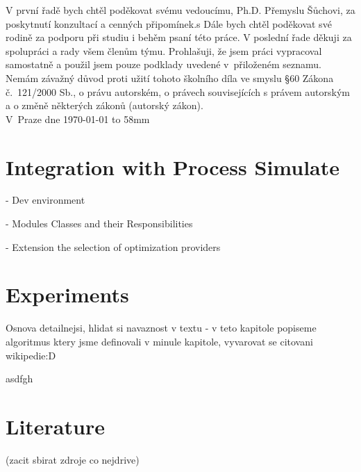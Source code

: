 \documentclass[11pt,twoside,a4paper]{book}
\author{Jan Dryk}
\begin{document}
%
\cleardoublepage

\maketitle
\cleardoublepage

{%
	V první řadě bych chtěl poděkovat svému vedoucímu, Ph.D. Přemyslu Šůchovi, za poskytnutí konzultací a cenných připomínek.s
	Dále bych chtěl poděkovat své rodině za podporu při studiu i behěm psaní této práce.
	V poslední řade děkuji za spolupráci a rady všem členům týmu.
}
{%
	Prohlašuji, že jsem práci vypracoval samostatně a použil jsem pouze podklady uvedené v~přiloženém seznamu.\\
	Nemám závažný důvod proti užití tohoto školního díla ve smyslu \S 60 Zákona č.~121/2000 Sb., o právu autorském, o právech souvisejících s právem autorským a o změně některých zákonů (autorský zákon).
\\[15mm]
	V~Praze dne \today \vspace{10mm} \hfill \hbox to 58mm{\tiny\dotfill}
}

\cleardoublepage


{
    
}
{
    
}

\setcounter{page}{1}

\tableofcontents







\section{Integration with Process Simulate}
- Dev environment

- Modules Classes and their Responsibilities

- Extension the selection of optimization providers

\section{Experiments}
Osnova detailnejsi, hlidat si navaznost v textu - v teto kapitole popiseme algoritmus ktery jsme definovali v minule kapitole, vyvarovat se citovani wikipedie:D

asdfgh
 



\section{Literature}
(zacit sbirat zdroje co nejdrive)




\printbibliography
\appendix





\end{document}
